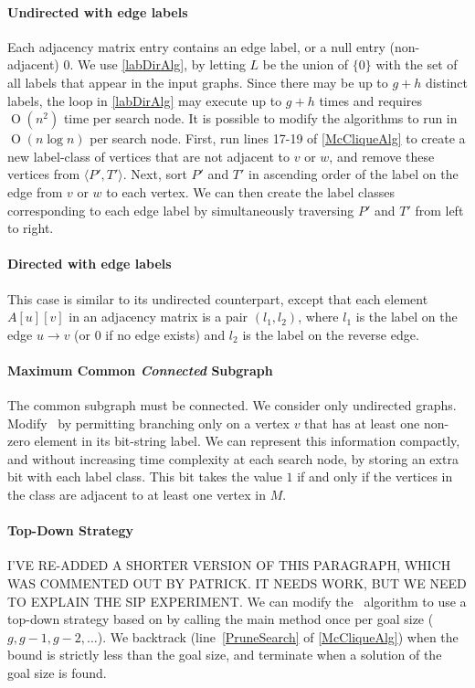 \documentclass[letterpaper]{article}
\newcommand{\citet}[1]{\citeauthor{#1} \shortcite{#1}}
\newcommand{\McSplit}{\textproc{McSplit}}
\newcommand{\lineref}[1]{line~\ref{#1}}
\newcommand{\BigO}[1]{\ensuremath{\operatorname{O}\left(#1\right)}}
\begin{document}
\paragraph{Undirected with edge labels} Each adjacency matrix
entry contains an edge label, or a null entry (non-adjacent) $0$.
We use \cref{labDirAlg}, by letting $L$ be
the union of $\{0\}$ with the set of all labels that appear in the input
graphs. Since there may be up to $g + h$ distinct labels, the loop in
\cref{labDirAlg} may execute up to $g + h$ times and
requires $\BigO{n^2}$ time per search
node.  It is possible to modify the algorithms to run in $\BigO{n \log n}$ per
search node.  First, run lines 17-19
of \cref{McCliqueAlg} to create a new label-class of vertices that are not
adjacent to $v$ or $w$, and remove these vertices from $\langle P',T' \rangle$.
Next, sort $P'$ and $T'$ in ascending order of the label on the edge from $v$
or $w$ to each vertex. We can then create the label classes corresponding to
each edge label by simultaneously traversing $P'$ and $T'$ from left to right.

\paragraph{Directed with edge labels} This case is similar to its undirected
counterpart, except that each element $A[u][v]$ in an adjacency matrix is a
pair $(l_1, l_2)$, where $l_1$ is the label on the edge $u \rightarrow v$ (or 0
if no edge exists) and $l_2$ is the label on the reverse edge.

\paragraph{Maximum Common \emph{Connected} Subgraph} The common subgraph must
be connected. We consider only undirected graphs.  Modify \McSplit\ by
permitting branching only on a vertex $v$ that has at least one non-zero
element in its bit-string label.  We can represent this information compactly,
and without increasing time complexity at each search node, by storing an extra
bit with each label class.  This bit takes the value $1$ if and only if the vertices in
the class are adjacent to at least one vertex in $M$.

\paragraph{Top-Down Strategy} I'VE RE-ADDED A SHORTER VERSION OF THIS
PARAGRAPH, WHICH WAS COMMENTED OUT BY PATRICK. IT NEEDS WORK, BUT WE NEED TO
EXPLAIN THE SIP EXPERIMENT. We can modify the \McSplit\ algorithm to use a
top-down strategy based on \citet{UpcomingAAAIPaper} by calling the main
 method once per goal size ($g, g-1, g-2, \dots$).  We
backtrack (\lineref{PruneSearch} of \cref{McCliqueAlg}) when the bound is
strictly less than the goal size, and terminate when a solution of the goal
size is found.
\end{document}
